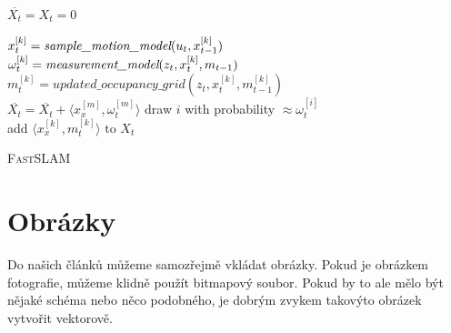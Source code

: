\documentclass[a4paper, 11pt]{article}
\begin{document}
\IncMargin{1.5em}
\begin{algorithm}
\label{algorithm:1}
\SetNlSty{}{}{:}
\SetNlSkip{0.5em}
\SetInd{1em}{1em}
\Indm\Indmm
{}
\Indpp\Indp
\BlankLine

$\overline{X_t}=X_t=0$

{$x_t^{[k]}=\emph{sample\_motion\_model}(u_t, x_{t-1}^{[k]})$\\
$\omega_t^{[k]}=\emph{measurement\_model}(z_t, x_t^{[k]}, m_{t-1})$\\
$m_t^{[k]}=updated\_occupancy\_grid(z_t, x_t^{[k]}, m_{t-1}^{[k]})$\\
$\overline{X_t}=\overline{X_t}+\langle x_x^{[m]},\omega_t^{[m]} \rangle$}
{draw $i$ with probability $\approx \omega_t^{[i]}$\\
add $\langle x_x^{[k]}, m_t^{[k]}\rangle \textrm{ to } X_t$}

\caption{\textsc{FastSLAM}}
\end{algorithm}
\DecMargin{1.5em}

\section{Obrázky}
Do našich článků můžeme samozřejmě vkládat obrázky. Pokud je obrázkem fotografie,
můžeme klidně použít bitmapový soubor. Pokud by to ale mělo být nějaké schéma nebo
něco podobného, je dobrým zvykem takovýto obrázek vytvořit vektorově.
\end{document}
